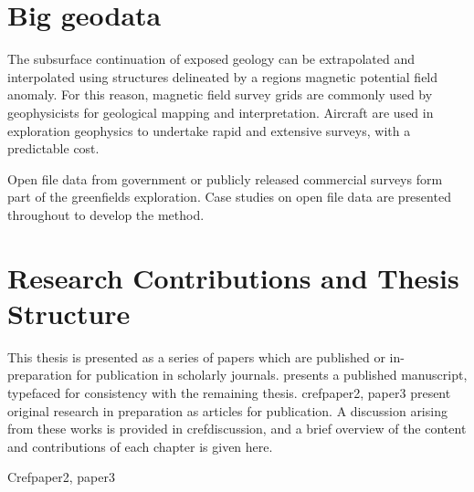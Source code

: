 \documentclass[manuscript.tex]{subfiles}
\begin{document}
\section{Big geodata} %


The subsurface continuation of exposed geology can be extrapolated and interpolated using structures delineated by a regions magnetic potential field anomaly.
For this reason, magnetic field survey grids are commonly used by geophysicists for geological mapping and interpretation.
Aircraft are used in exploration geophysics to undertake rapid and extensive surveys, with a predictable cost.


Open file data from government or publicly released commercial surveys form part of the greenfields exploration.
Case studies on open file data are presented throughout to develop the method.


\section{Research Contributions and Thesis Structure}
This thesis is presented as a series of papers which are published or in-preparation for publication in scholarly journals.
 presents a published manuscript, typefaced for consistency with the remaining thesis.
cref{paper2, paper3} present original research in preparation as articles for publication.
A discussion arising from these works is provided in cref{discussion}, and a brief overview of the content and contributions of each chapter is given here.

Cref{paper2, paper3} 
\end{document}
